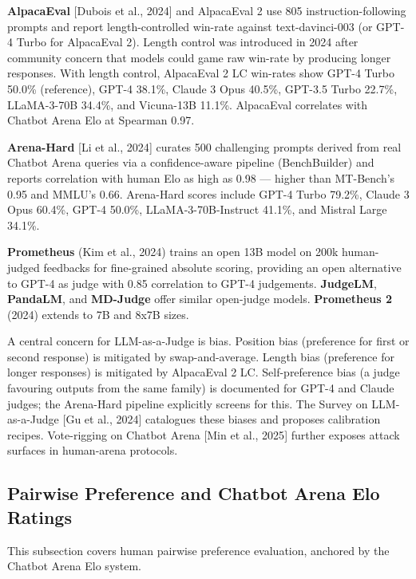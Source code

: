 \textbf{AlpacaEval} {[}Dubois et al., 2024{]} and AlpacaEval 2 use 805 instruction-following prompts and report length-controlled win-rate against text-davinci-003 (or GPT-4 Turbo for AlpacaEval 2). Length control was introduced in 2024 after community concern that models could game raw win-rate by producing longer responses. With length control, AlpacaEval 2 LC win-rates show GPT-4 Turbo 50.0\% (reference), GPT-4 38.1\%, Claude 3 Opus 40.5\%, GPT-3.5 Turbo 22.7\%, LLaMA-3-70B 34.4\%, and Vicuna-13B 11.1\%. AlpacaEval correlates with Chatbot Arena Elo at Spearman 0.97.

\textbf{Arena-Hard} {[}Li et al., 2024{]} curates 500 challenging prompts derived from real Chatbot Arena queries via a confidence-aware pipeline (BenchBuilder) and reports correlation with human Elo as high as 0.98 --- higher than MT-Bench's 0.95 and MMLU's 0.66. Arena-Hard scores include GPT-4 Turbo 79.2\%, Claude 3 Opus 60.4\%, GPT-4 50.0\%, LLaMA-3-70B-Instruct 41.1\%, and Mistral Large 34.1\%.

\textbf{Prometheus} (Kim et al., 2024) trains an open 13B model on 200k human-judged feedbacks for fine-grained absolute scoring, providing an open alternative to GPT-4 as judge with 0.85 correlation to GPT-4 judgements. \textbf{JudgeLM}, \textbf{PandaLM}, and \textbf{MD-Judge} offer similar open-judge models. \textbf{Prometheus 2} (2024) extends to 7B and 8x7B sizes.

A central concern for LLM-as-a-Judge is bias. Position bias (preference for first or second response) is mitigated by swap-and-average. Length bias (preference for longer responses) is mitigated by AlpacaEval 2 LC. Self-preference bias (a judge favouring outputs from the same family) is documented for GPT-4 and Claude judges; the Arena-Hard pipeline explicitly screens for this. The Survey on LLM-as-a-Judge {[}Gu et al., 2024{]} catalogues these biases and proposes calibration recipes. Vote-rigging on Chatbot Arena {[}Min et al., 2025{]} further exposes attack surfaces in human-arena protocols.

\subsection{Pairwise Preference and Chatbot Arena Elo Ratings}\label{pairwise-preference-and-chatbot-arena-elo-ratings}

This subsection covers human pairwise preference evaluation, anchored by the Chatbot Arena Elo system.

